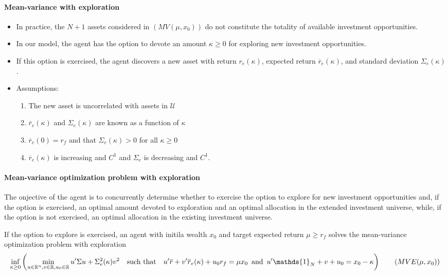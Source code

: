 \paragraph{Mean-variance with exploration}
\begin{itemize}
    \item In practice, the $N+1$ assets considered in $(MV(\mu,x_0))$ do not
        constitute the totality of available investment opportunities.
    \item In our model, the agent has the option to devote an amount $\kappa \geq 0$
        for exploring new investment opportunities.
    \item If this option is exercised, the agent discovers a new asset with
        return $r_e(\kappa)$, expected return $\overline{r}_e (\kappa)$, and
        standard deviation $\Sigma_e (\kappa)$.
    \item Assumptions:
        \begin{enumerate}[1)]
            \item The new asset is uncorrelated with assets in $\mathcal{U}$
            \item $\overline{r}_e (\kappa)$ and $\Sigma_e (\kappa)$ are known
                as a function of $\kappa$
            \item $\overline{r}_e (0) = r_f$ and that $\Sigma_e (\kappa) > 0$
                for all $\kappa \geq 0$
            \item $\overline{r}_e (\kappa)$ is increasing and $C^1$ and $\Sigma_e$
                is decreasing and $C^1$.
        \end{enumerate}
\end{itemize}

\paragraph{Mean-variance optimization problem with exploration}
The onjective of the agent is to concurrently determine whether to exercise
the option to explore for new investment opportunities and, if the option is
exercised, an optimal amount devoted to exploration and an optimal allocation
in the extended investment universe, while, if the option is not exercised,
an optimal allocation in the existing investment universe.

If the option to explore is exercised, an agent with initila wealth $x_0$ and
target expected return $\mu \geq r_f$ solves the mean-variance optimization
problem with exploration
\begin{align*}
    \inf_{\kappa \geq 0} \klammer{\min_{u \in \R^n , v \in \R, u_0 \in \R}
    u' \Sigma u + \Sigma_e^2 (\kappa) v^2 \hspace{10pt} \text{such that}
    \hspace{10pt} u' \overline{r} + v' \overline{r}_e (\kappa) + u_0 r_f = \mu x_0
    \hspace{5pt} \text{and} \hspace{5pt} u' \mathds{1}_N + v + u_0 = x_0 - \kappa}
    \hspace{20pt} (MVE(\mu,x_0))
\end{align*}

